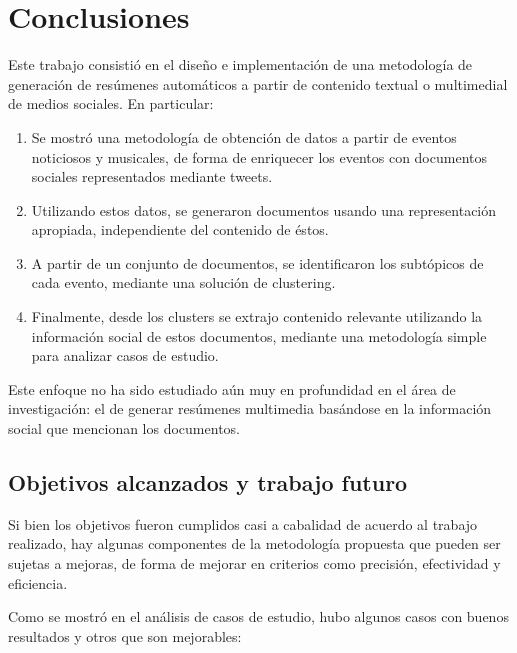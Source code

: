 
\chapter{Conclusiones}
\label{sec-5}

\label{cap:conclusiones}

Este trabajo consistió en el diseño e implementación de una
metodología de generación de resúmenes automáticos a partir de
contenido textual o multimedial de medios sociales. En particular:

\begin{enumerate}
\item Se mostró una metodología de obtención de datos a partir de eventos
   noticiosos y musicales, de forma de enriquecer los eventos con
   documentos sociales representados mediante tweets.
\item Utilizando estos datos, se generaron documentos usando una
   representación apropiada, independiente del contenido de éstos.
\item A partir de un conjunto de documentos, se identificaron los
   subtópicos de cada evento, mediante una solución de clustering.
\item Finalmente, desde los clusters se extrajo contenido relevante
   utilizando la información social de estos documentos, mediante una
   metodología simple para analizar casos de estudio.
\end{enumerate}
Este enfoque no ha sido estudiado aún muy en profundidad en el área de
investigación: el de generar resúmenes multimedia basándose en la
información social que mencionan los documentos.

\section{Objetivos alcanzados y trabajo futuro}
\label{sec-5.1}


Si bien los objetivos fueron cumplidos casi a cabalidad de acuerdo al
trabajo realizado, hay algunas componentes de la metodología propuesta
que pueden ser sujetas a mejoras, de forma de mejorar en criterios
como precisión, efectividad y eficiencia.

Como se mostró en el análisis de casos de estudio, hubo algunos casos
con buenos resultados y otros que son mejorables:

